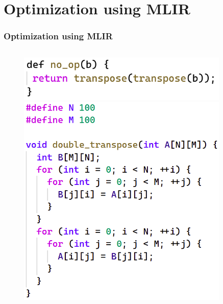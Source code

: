 \documentclass{beamer}
\begin{document}
\section{Optimization using MLIR}
\begin{frame}
  \frametitle{Optimization using MLIR}
  \begin{columns}
    \begin{column}{0.35\textwidth}
      \begin{figure}[h]
        \centering
        \includegraphics[width=\textwidth]{pictures/TransposeTranspose.png}
        \includegraphics[width=\textwidth]{pictures/CodeExample.png}
      \end{figure}
    \end{column}
    \vrule
    \begin{column}{0.6\textwidth}
      \begin{figure}[h]
        \centering

\end{figure}
\end{column}
\end{columns}
\end{frame}
\end{document}
